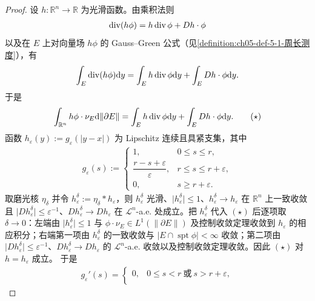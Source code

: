 \documentclass[../../main.tex]{subfiles}%
\begin{document}
\begin{proof}
设 $h:\mathbb{R}^n\to\mathbb{R}$ 为光滑函数。由乘积法则
\begin{align*}
\operatorname{div}(h\phi)=h\operatorname{div}\phi+Dh\cdot\phi
\end{align*}
以及在 $E$ 上对向量场 $h\phi$ 的 Gauss--Green 公式（见\cref{definition:ch05-def-5-1-周长测度}），有%
\begin{align*}
\int_E\operatorname{div}(h\phi)\mathrm{d} y=\int_E h\operatorname{div}\phi\mathrm{d} y+\int_E Dh\cdot\phi\mathrm{d} y .
\end{align*}
于是
\begin{align*}
\int_{\mathbb{R}^n}h\phi\cdot\nu_E\mathrm{d}\lVert\partial E\rVert=\int_E h\operatorname{div}\phi\mathrm{d} y+\int_E Dh\cdot\phi\mathrm{d} y .\qquad(\star)
\end{align*}
函数 $h_\varepsilon(y):=g_\varepsilon(\lvert y-x\rvert)$ 为 Lipschitz 连续且具紧支集，其中
\begin{align*}
g_\varepsilon(s):=
\begin{cases}
1, & 0\leqslant s\leqslant r,\\[2pt]
\dfrac{r-s+\varepsilon}{\varepsilon}, & r\leqslant s\leqslant r+\varepsilon,\\[2pt]
0, & s\geqslant r+\varepsilon .
\end{cases}
\end{align*}
取磨光核 $\eta_\delta$ 并令 $h_\varepsilon^\delta:=\eta_\delta*h_\varepsilon$，则 $h_\varepsilon^\delta$ 光滑、$\lvert h_\varepsilon^\delta\rvert\leqslant1$、$h_\varepsilon^\delta\to h_\varepsilon$ 在 $\mathbb{R}^n$ 上一致收敛且 $\lvert Dh_\varepsilon^\delta\rvert\leqslant\varepsilon^{-1}$、$Dh_\varepsilon^\delta\to Dh_\varepsilon$ 在 $\mathcal{L}^n$-a.e. 处成立。把 $h_\varepsilon^\delta$ 代入 $(\star)$ 后逐项取 $\delta\to0$：左端由 $\lvert h_\varepsilon^\delta\rvert\leqslant1$ 与 $\phi\cdot\nu_E\in L^1(\lVert\partial E\rVert)$ 及控制收敛定理收敛到 $h_\varepsilon$ 的相应积分；右端第一项由 $h_\varepsilon^\delta$ 的一致收敛与 $\lvert E\cap\operatorname{spt}\phi\rvert<\infty$ 收敛；第二项由 $\lvert Dh_\varepsilon^\delta\rvert\leqslant\varepsilon^{-1}$、$Dh_\varepsilon^\delta\to Dh_\varepsilon$ 的 $\mathcal{L}^n$-a.e. 收敛以及控制收敛定理收敛。因此 $(\star)$ 对 $h=h_\varepsilon$ 成立。
于是
\begin{align*}
g_\varepsilon'(s)=
\begin{cases}
0, & 0\leqslant s<r\ \text{或}\ s>r+\varepsilon,\\[2pt]

\end{cases}
\end{align*}
\end{proof}
\end{document}
